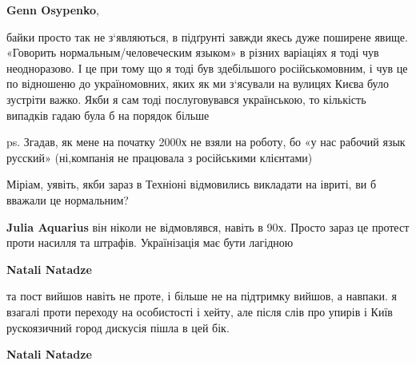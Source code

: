 \begin{itemize}
\begin{itemize}
\textbf{Genn Osypenko}, 

байки просто так не з‘являються, в підґрунті завжди якесь дуже поширене явище.
«Говорить нормальным/человеческим языком» в різних варіаціях я тоді чув
неодноразово. І це при тому що я тоді був здебільшого російськомовним, і чув це
по відношеню до україномовних, яких як ми з‘ясували на вулицях Києва було
зустріти важко. Якби я сам тоді послуговувався українською, то кількість
випадків гадаю була б на порядок більше

ps. Згадав, як мене на початку 2000х не взяли на роботу, бо «у нас рабочий язык
русский» (ні,компанія не працювала з російськими клієнтами)

\end{itemize}

 

Міріам, уявіть, якби зараз в Техніоні відмовились викладати на івриті, ви б
вважали це нормальним?

\begin{itemize}
 
\textbf{Julia Aquarius} він ніколи не відмовлявся, навіть в 90х. Просто зараз це протест проти насилля та штрафів. Українізація має бути лагідною

 
\textbf{Natali Natadze} 

та пост вийшов навіть не проте, і більше не на підтримку вийшов, а навпаки. я
взагалі проти переходу на особистості і хейту, але після слів про упирів і Київ
рускоязичний город дискусія пішла в цей бік.


 
\textbf{Natali Natadze} 


\end{itemize}
\end{itemize}
